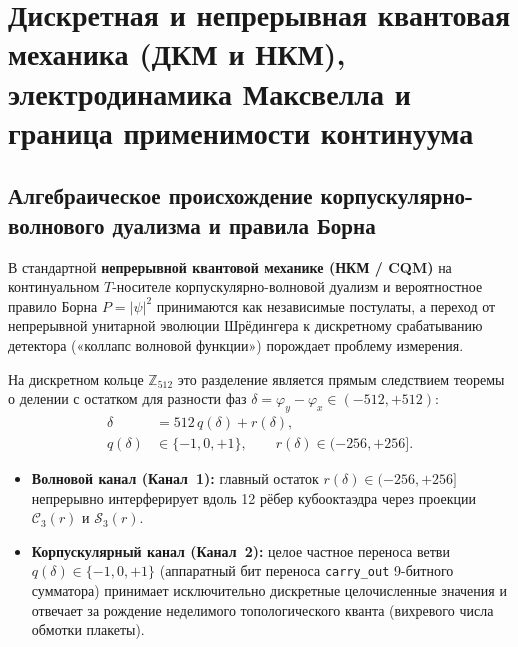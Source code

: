 \chapter{Дискретная и непрерывная квантовая механика (ДКМ и НКМ), электродинамика Максвелла и граница применимости континуума}
\label{ch:mono-qm-maxwell}

\section{Алгебраическое происхождение корпускулярно-волнового дуализма и правила Борна}

В стандартной \textbf{непрерывной квантовой механике (НКМ / CQM)} на континуальном $T$-носителе корпускулярно-волновой дуализм и вероятностное правило Борна $P = |\psi|^2$ принимаются как независимые постулаты, а переход от непрерывной унитарной эволюции Шрёдингера к дискретному срабатыванию детектора («коллапс волновой функции») порождает проблему измерения.

На дискретном кольце $\mathbb{Z}_{512}$ это разделение является прямым следствием теоремы о делении с остатком для разности фаз $\delta = \varphi_y - \varphi_x \in (-512, +512)$:
\begin{align}
  \delta &= 512\,q(\delta) + r(\delta), \label{eq:mono-quotient-remainder} \\
  q(\delta) &\in \{-1, 0, +1\}, \qquad r(\delta) \in (-256, +256]. \label{eq:mono-quotient-remainder-bounds}
\end{align}
\begin{itemize}[leftmargin=*,noitemsep]
\item \textbf{Волновой канал (Канал~1):} главный остаток $r(\delta) \in (-256, +256]$ непрерывно интерферирует вдоль 12 рёбер кубооктаэдра через проекции $\mathcal{C}_3(r)$ и $\mathcal{S}_3(r)$.
\item \textbf{Корпускулярный канал (Канал~2):} целое частное переноса ветви $q(\delta) \in \{-1, 0, +1\}$ (аппаратный бит переноса \texttt{carry\_out} 9-битного сумматора) принимает исключительно дискретные целочисленные значения и отвечает за рождение неделимого топологического кванта (вихревого числа обмотки плакеты).
\end{itemize}

